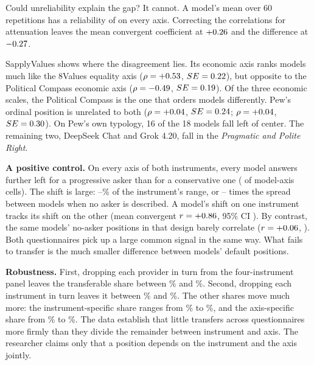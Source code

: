 \documentclass[12pt]{article}
\begin{document}
Could unreliability explain the gap? It cannot. A model's mean over 60 repetitions has a reliability of \RelMin{} on
every axis. Correcting the correlations for attenuation leaves the mean convergent coefficient at
$+0.26$ and the difference at $-0.27$.

\begin{table}[H]
\centering
\caption{Multitrait-multimethod coefficients across 19 models (July 2026). Entries are Pearson correlations of
direction-aligned model means, with $SE(r)=\sqrt{(1-r^2)/(n-2)}$. Means and their difference carry bootstrap standard
errors over models.}
\label{tab:mtmm}
\small

\end{table}

SapplyValues shows where the disagreement lies. Its economic axis ranks models much like the 8Values equality axis
($\rho=+0.53$, $SE=0.22$), but opposite to the Political Compass economic axis ($\rho=-0.49$,
$SE=0.19$). Of the three economic scales, the Political Compass is the one that orders models
differently. Pew's ordinal position is unrelated to both ($\rho=+0.04$, $SE=0.24$;
$\rho=+0.04$, $SE=0.30$). On Pew's own typology, 16 of the 18 models fall left of center. The remaining two,
DeepSeek Chat and Grok 4.20, fall in the \emph{Pragmatic and Polite Right}.

\textbf{A positive control.} On every axis of both
instruments, every model answers further left for a progressive asker than for a conservative one (\KGPositive{} of
\KGCells{} model-axis cells). The shift is large: \KGRangeLo--\KGRangeHi\% of the instrument's range, or
\KGSdLo--\KGSdHi{} times the spread between models when no asker is described. A model's shift on one instrument tracks its shift on the other (mean convergent
$r=+0.86$, 95\% CI \KGShiftCI). By contrast, the same models' no-asker positions in that design barely correlate
($r=+0.06$, \KGBaseCI). Both questionnaires pick up a large common signal in the same way. What fails
to transfer is the much smaller difference between models' default positions.

\textbf{Robustness.} First, dropping each provider in turn
from the four-instrument panel leaves the transferable share between \LopoMmin\% and \LopoMmax\%. Second, dropping each
instrument in turn leaves it between \LoioMmin\% and \LoioMmax\%. The other shares move much more: the
instrument-specific share ranges from \LoioMImin\% to \LoioMImax\%, and the axis-specific share from \LoioMAmin\% to
\LoioMAmax\%. The data establish that little transfers across questionnaires more firmly than they
divide the remainder between instrument and axis. The researcher claims only that a position depends on the
instrument and the axis jointly.
\end{document}

